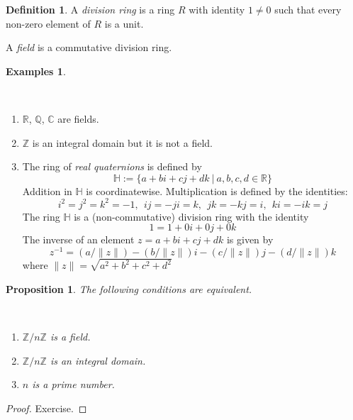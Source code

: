 \documentclass[12pt, letterpaper, oneside]{article}
\theoremstyle{plain}
\newtheorem{proposition}[theorem]{Proposition}
\theoremstyle{definition}
\newtheorem{definition}[theorem]{Definition}
\newtheorem{examples}[theorem]{Examples}
\newcommand{\Z}{{\mathbb Z}}
\newcommand{\Q}{{\mathbb Q}}
\newcommand{\R}{{\mathbb R}}
\newcommand{\C}{{\mathbb C}}
\newcommand{\HH}{{\mathbb H}}
\newcommand{\benu}{\begin{enumerate}}
\newcommand{\eenu}{\end{enumerate}}
\newcommand{\vs}{\vskip 5mm}
\newcommand{\isep}[1][0]{\setlength{\itemsep}{#1 mm}}
\begin{document}
\vs\vs

\begin{definition}
A  \emph{division ring} is a ring $R$ with identity $1\neq 0$ such that every non-zero element of
$R$ is a unit. 

A \emph{field} is a commutative division ring. 
\end{definition}

\vs\vs

\begin{examples}\ 

\vskip -13mm

\ 
\benu
\isep[5]
\item $\R$, $\Q$, $\C$ are fields.
\item $\Z$ is an integral domain but it is not a field. 
\item The ring of \emph{real quaternions} is defined by
$$\HH:= \{a + bi +cj +dk \ | \ a, b, c, d \in \R \}$$
Addition in $\HH$ is coordinatewise. Multiplication is defined by the identities:
$$i^{2}= j^{2}= k^{2}=-1, \ \ ij = -ji = k, \ \ jk= -kj = i, \ \ ki= -ik = j$$
The ring $\HH$ is a (non-commutative) division ring with the identity
$$1 = 1 + 0i + 0j + 0k$$
The inverse of  an element $z = a+bi+cj+dk$ is given by 
$$z^{-1} = (a/\|z\|)-(b/\|z\|)i - (c/\|z\|)j - (d/\|z\|)k$$
where $\|z \| = \sqrt{a^{2}+b^{2}+c^{2}+d^{2}}$
\eenu

\end{examples}

\vs\vs

\begin{proposition}
The following conditions are equivalent.

\vskip -13mm

\ 
\benu
\isep[0]
\item $\Z/n\Z$ is a field.
\item $\Z/n\Z$ is an integral domain.
\item $n$ is a prime number.
\eenu
\end{proposition}

\vs

\begin{proof}
Exercise.
\end{proof}

\vs\vs



\end{document}
